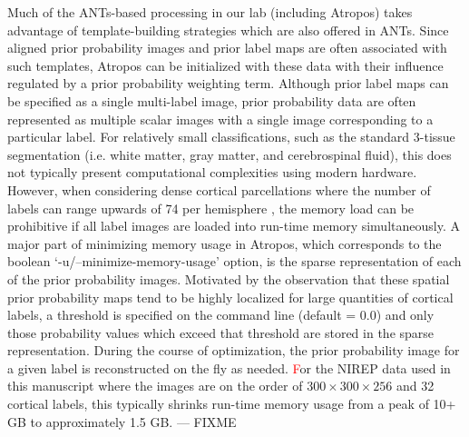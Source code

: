 \documentclass[11pt,english]{article}
\begin{document}
Much of the ANTs-based processing in our lab (including Atropos) takes advantage of template-building strategies 
\citep{Avants2010} which are also offered  in ANTs.  Since aligned prior probability images and prior label maps are often 
associated with such templates, Atropos can be initialized with these data with their influence regulated by a prior probability
weighting term.  Although prior label maps can be specified as a single multi-label image, prior probability data are often represented as
multiple scalar images with a single image corresponding to a particular label.  For relatively small classifications, such as 
the standard 3-tissue segmentation (i.e. white matter, gray matter, and cerebrospinal fluid), this does not typically present
computational complexities using modern hardware.  However, when considering dense cortical parcellations where the number
of labels can range upwards of 74 per hemisphere \citep{Destrieux2010}, the memory load can be prohibitive if all label images 
are loaded into run-time memory simultaneously.  A major part of minimizing memory usage in Atropos,  which corresponds to the boolean `{\ttfamily -u/--minimize-memory-usage}' option, is the sparse representation of each of the prior probability images.
Motivated by the observation that these spatial prior probability maps tend to be highly localized for large quantities of  
cortical labels, a threshold is specified on the command line (default = 0.0) and only those probability values which exceed 
that threshold are stored in the sparse representation.  During the course of optimization, the prior probability image for a
given label is reconstructed on the fly as needed.  {\textcolor{red}For the NIREP data used in this manuscript where the images are 
on the order of $300 \times 300 \times 256$ and 32 cortical labels, this typically shrinks run-time memory usage from a 
peak of 10+ GB to approximately 1.5 GB. --- FIXME }
 
\end{document}
